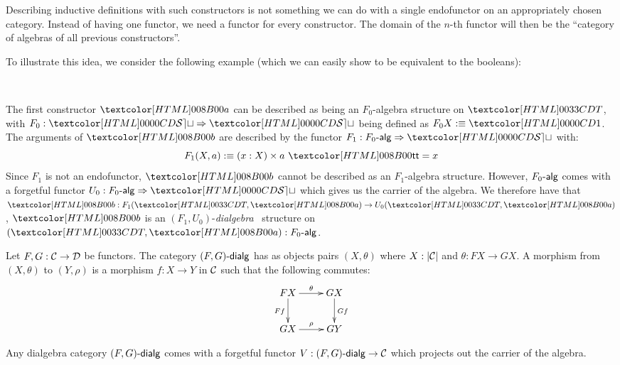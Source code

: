 Describing inductive definitions with such constructors is not
something we can do with a single endofunctor on an appropriately
chosen category. Instead of having one functor, we need a functor for
every constructor. The domain of the $n$-th functor will then be the
``category of algebras of all previous constructors''. 

\begin{example}
  \label{silly-type}
  To illustrate this idea, we consider the following example (which we
  can easily show to be equivalent to the booleans):
  \begin{datatype}{\Tty}{\Set}
    \constr{\Ta}{\unitty \to \Tty} \\
  \end{datatype}
\end{example}

The first constructor $\Ta$ can be described as being an $F_0$-algebra
structure on $\Tty$, with $F_0 : \Func{\SET}{\SET}$ being defined as
$F_0 X \ddefeq \unitty$. The arguments of $\Tb$ are described by the
functor $F_1 : \Func{\algcat{F_0}}{\SET}$ with:
$$
F_1 (X,a) \ddefeq (x : X) \times a\ \unitval = x
$$
Since $F_1$ is not an endofunctor, $\Tb$ cannot be described as an
$F_1$-algebra structure. However, $\algcat{F_0}$ comes with a
forgetful functor $U_0 : \Func{\algcat{F_0}}{\SET}$ which gives us the
carrier of the algebra. We therefore have that
$\Tb : F_1(\Tty,\Ta) \to U_0(\Tty,\Ta)$, \ie $\Tb$ is an
$(F_1,U_0)$-\emph{dialgebra}~\cite{Hagino1987} structure on
$(\Tty,\Ta) : \algcat{F_0}$.
%
\begin{definition}
  \label{dialg}
  Let $F, G : \mathcal{C} \to \mathcal{D}$ be functors. The category $\dialgcat{F}{G}$ has
  as objects pairs $(X, \theta)$ where $X : |\mathcal{C}|$ and $\theta : F X \to
  G X$. A morphism from $(X, \theta)$ to $(Y, \rho)$ is a morphism $f : X
  \to Y$ in $\mathcal{C}$ such that the following commutes:
  $$
  \xymatrix{
  F X \ar[r]^{\theta} \ar[d]_{F f} &G X \ar[d]^{G f} \\
  G X \ar[r]^{\rho}  &G Y
  }
  $$
\end{definition}
%

\begin{remark}
  Any dialgebra category $\dialgcat{F}{G}$ comes with a forgetful
  functor $V : \dialgcat{F}{G} \to \Cc$ which projects out the carrier
  of the algebra.
\end{remark}

